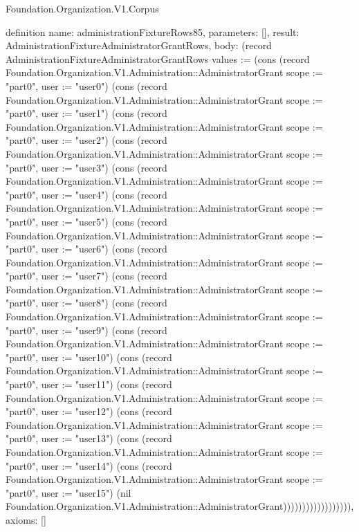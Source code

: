 \begin{lexlean}{Foundation.Organization.V1.Corpus}
\begin{semanticmodule}
definition{
  name: administrationFixtureRows85,
  parameters: [],
  result: AdministrationFixtureAdministratorGrantRows,
  body: (record AdministrationFixtureAdministratorGrantRows {values := (cons (record Foundation.Organization.V1.Administration::AdministratorGrant {scope := "part0", user := "user0"}) (cons (record Foundation.Organization.V1.Administration::AdministratorGrant {scope := "part0", user := "user1"}) (cons (record Foundation.Organization.V1.Administration::AdministratorGrant {scope := "part0", user := "user2"}) (cons (record Foundation.Organization.V1.Administration::AdministratorGrant {scope := "part0", user := "user3"}) (cons (record Foundation.Organization.V1.Administration::AdministratorGrant {scope := "part0", user := "user4"}) (cons (record Foundation.Organization.V1.Administration::AdministratorGrant {scope := "part0", user := "user5"}) (cons (record Foundation.Organization.V1.Administration::AdministratorGrant {scope := "part0", user := "user6"}) (cons (record Foundation.Organization.V1.Administration::AdministratorGrant {scope := "part0", user := "user7"}) (cons (record Foundation.Organization.V1.Administration::AdministratorGrant {scope := "part0", user := "user8"}) (cons (record Foundation.Organization.V1.Administration::AdministratorGrant {scope := "part0", user := "user9"}) (cons (record Foundation.Organization.V1.Administration::AdministratorGrant {scope := "part0", user := "user10"}) (cons (record Foundation.Organization.V1.Administration::AdministratorGrant {scope := "part0", user := "user11"}) (cons (record Foundation.Organization.V1.Administration::AdministratorGrant {scope := "part0", user := "user12"}) (cons (record Foundation.Organization.V1.Administration::AdministratorGrant {scope := "part0", user := "user13"}) (cons (record Foundation.Organization.V1.Administration::AdministratorGrant {scope := "part0", user := "user14"}) (cons (record Foundation.Organization.V1.Administration::AdministratorGrant {scope := "part0", user := "user15"}) (nil Foundation.Organization.V1.Administration::AdministratorGrant)))))))))))))))))}),
  axioms: []
}


\end{semanticmodule}
\end{lexlean}
